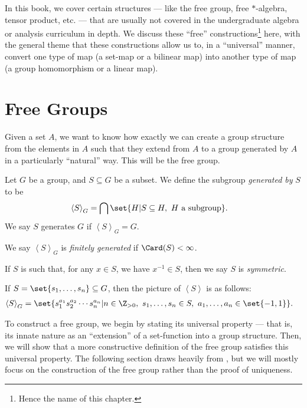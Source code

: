 In this book, we cover certain structures --- like the free group, free $\ast$-algebra, tensor product, etc. --- that are usually not covered in the undergraduate algebra or analysis curriculum in depth. We discuss these ``free'' constructions\footnote{Hence the name of this chapter.} here, with the general theme that these constructions allow us to, in a ``universal'' manner, convert one type of map (a set-map or a bilinear map) into another type of map (a group homomorphism or a linear map).
\section{Free Groups}%
Given a set $A$, we want to know how exactly we can create a group structure from the elements in $A$ such that they extend from $A$ to a group generated by $A$ in a particularly ``natural'' way. This will be the free group.
\begin{definition}\label{def:generating_sets}
  Let $G$ be a group, and $S\subseteq G$ be a subset. We define the subgroup \textit{generated by} $S$ to be
  \begin{align*}
    \left\langle S \right\rangle_{G} &= \bigcap \set{H | S\subseteq H,~H\text{ a subgroup}}.
  \end{align*}
  We say $S$ generates $G$ if $\left\langle S \right\rangle_{G} = G$.\newline

  We say $\left\langle S \right\rangle_{G}$ is \textit{finitely generated} if $\Card(S) < \infty$.\newline

  If $S$ is such that, for any $x\in S$, we have $x^{-1}\in S$, then we say $S$ is \textit{symmetric}.
\end{definition}
\begin{fact}
  If $S = \set{s_1,\dots,s_n}\subseteq G$, then the picture of $\left\langle S \right\rangle$ is as follows:
  \begin{align*}
    \left\langle S \right\rangle_{G} &= \set{s_1^{a_1}s_2^{a_2}\cdots s_n^{a_n} | n\in\N,~s_1,\dots,s_n\in S,~a_1,\dots,a_n\in \set{-1,1}}.
  \end{align*}
\end{fact}
To construct a free group, we begin by stating its universal property --- that is, its innate nature as an ``extension'' of a set-function into a group structure. Then, we will show that a more constructive definition of the free group satisfies this universal property. The following section draws heavily from \cite{loh_geometric_group_theory}, but we will mostly focus on the construction of the free group rather than the proof of uniqueness.
